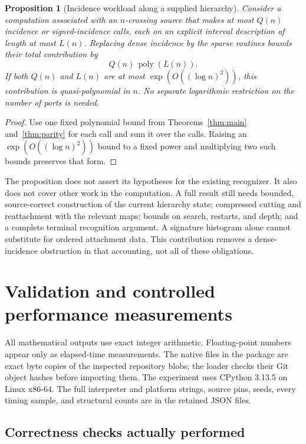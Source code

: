 \documentclass[11pt,letterpaper]{article}
\newtheorem{proposition}[theorem]{Proposition}
\theoremstyle{definition}\newtheorem{definition}[theorem]{Definition}
\theoremstyle{remark}\newtheorem{remark}[theorem]{Remark}
\newcommand{\poly}{\operatorname{poly}}
\begin{document}
\begin{proposition}[Incidence workload along a supplied hierarchy]
\label{prop:global}
Consider a computation associated with an $n$-crossing source that makes at most $Q(n)$ incidence or signed-incidence calls, each on an explicit interval description of length at most $L(n)$. Replacing dense incidence by the sparse routines bounds their total contribution by
\[
Q(n)\,\poly(L(n)).
\]
If both $Q(n)$ and $L(n)$ are at most $\exp(O((\log n)^2))$, this contribution is quasi-polynomial in $n$. No separate logarithmic restriction on the number of ports is needed.
\end{proposition}
\begin{proof}
Use one fixed polynomial bound from Theorems~\ref{thm:main} and~\ref{thm:parity} for each call and sum it over the calls. Raising an $\exp(O((\log n)^2))$ bound to a fixed power and multiplying two such bounds preserves that form.
\end{proof}

The proposition does not assert its hypotheses for the existing recognizer. It also does not cover other work in the computation. A full result still needs bounded, source-correct construction of the current hierarchy state; compressed cutting and reattachment with the relevant maps; bounds on search, restarts, and depth; and a complete terminal recognition argument. A signature histogram alone cannot substitute for ordered attachment data. This contribution removes a dense-incidence obstruction in that accounting, not all of these obligations.

\section{Validation and controlled performance measurements}
\label{sec:experiments}

All mathematical outputs use exact integer arithmetic. Floating-point numbers appear only as elapsed-time measurements. The native files in the package are exact byte copies of the inspected repository blobs; the loader checks their Git object hashes before importing them. The experiment uses CPython 3.13.5 on Linux x86-64. The full interpreter and platform strings, source pins, seeds, every timing sample, and structural counts are in the retained JSON files.

\subsection{Correctness checks actually performed}
\end{document}

